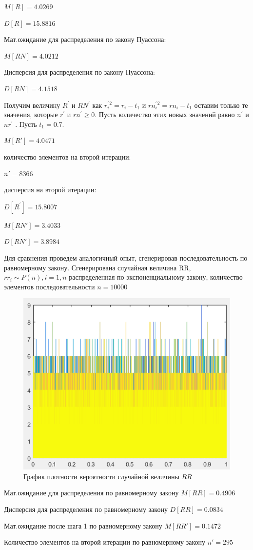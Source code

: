 $M[R]= 4.0269$ 

$D[R]= 15.8816$ 

Мат.ожидание для распределения по закону Пуассона: 

$M[RN]= 4.0212$ 

Дисперсия для распределения по закону Пуассона: 

$D[RN]= 4.1518$ 

Получим величину $R^{'}$ и $RN^{'}$ как $r_{i}^{'}{}^{2}=r_{i}-t_{1}$
и $rn_{i}^{'}{}^{2}=rn_{i}-t_{1}$ оставим только те значения, которые
${r^{'}}$ и ${rn^{'}\geq0}$. Пусть количество этих новых
значений равно $n^{'}$ и $nr^{'}$ . Пусть $t_{1}=0.7.$ 

$M[R']= 4.0471$ 

количество элементов на второй итерации: 

$n'= 8366$ 

дисперсия на второй итерации: 

$D[R^{'}]=15.8007$

$M[RN']= 3.4033$ 

$D[RN']= 3.8984$ 

Для сравнения проведем аналогичный опыт, сгенерировав последовательность
по равномерному закону. Сгенерирована случайная величина RR, $rr_{i}\sim P(n),i=1,n$
распределенная по экспоненциальному закону, количество элементов последовательности
$ n=10000  $
\begin{figure}[h]
	\centering
	\includegraphics[width=0.4\linewidth]{img/kich_bur/image6.png} 
	\caption{График плотности вероятности случайной величины $RR$ }
	\label{fig:img6}
\end{figure}

Мат.ожидание для распределения по равномерному закону $M[RR]=0.4906$ 

Дисперсия для распределения по равномерному закону $D[RR]=
0.0834 $

Мат.ожидание после шага 1 по равномерному закону $M[RR']=
0.1472 $

Количество элементов на второй итерации по равномерному закону $n'=
295 $

